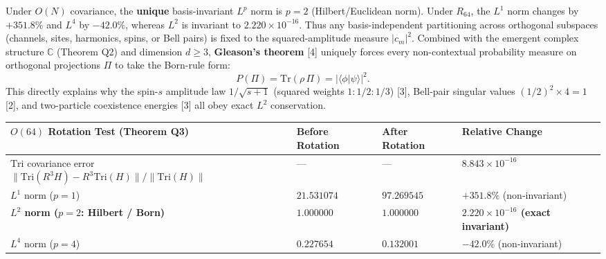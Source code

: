 \documentclass[
  a4paper,
]{article}
\newcounter{none} %
\begin{document}
Under \(O(N)\) covariance, the \textbf{unique} basis-invariant \(L^p\)
norm is \textbf{\(p = 2\)} (Hilbert/Euclidean norm). Under \(R_{64}\),
the \(L^1\) norm changes by \(+351.8\%\) and \(L^4\) by \(-42.0\%\),
whereas \(L^2\) is invariant to \textbf{\(2.220 \times 10^{-16}\)}. Thus
any basis-independent partitioning across orthogonal subspaces
(channels, sites, harmonics, spins, or Bell pairs) is fixed to the
squared-amplitude measure \(|c_m|^2\). Combined with the emergent
complex structure \(\mathbb{C}\) (Theorem Q2) and dimension \(d \ge 3\),
\textbf{Gleason's theorem} {[}4{]} uniquely forces every non-contextual
probability measure on orthogonal projections \(\Pi\) to take the
Born-rule form:
\[P(\Pi) = \mathrm{Tr}(\rho\,\Pi) = |\langle \phi | \psi \rangle|^2.\]
This directly explains why the spin-\(s\) amplitude law \(1/\sqrt{s+1}\)
(squared weights \(1:1/2:1/3\)) {[}3{]}, Bell-pair singular values
\((1/2)^2 \times 4 = 1\) {[}2{]}, and two-particle coexistence energies
{[}3{]} all obey exact \(L^2\) conservation.

{\def\LTcaptype{none} %
\begin{longtable}[]{@{}
  >{\raggedright\arraybackslash}p{}
  >{\centering\arraybackslash}p{}
  >{\centering\arraybackslash}p{}
  >{\centering\arraybackslash}p{}@{}}
\toprule\noalign{}
\begin{minipage}[b]{\linewidth}\raggedright
\(O(64)\) Rotation Test (Theorem Q3)
\end{minipage} & \begin{minipage}[b]{\linewidth}\centering
Before Rotation
\end{minipage} & \begin{minipage}[b]{\linewidth}\centering
After Rotation
\end{minipage} & \begin{minipage}[b]{\linewidth}\centering
Relative Change
\end{minipage} \\
\midrule\noalign{}
\endhead
\bottomrule\noalign{}
\endlastfoot
\(\mathrm{Tri}\) covariance error
\(\|\mathrm{Tri}(R^3 H)-R^3\mathrm{Tri}(H)\|/\|\mathrm{Tri}(H)\|\) & ---
& --- & \textbf{\(8.843 \times 10^{-16}\)} \\
\(L^1\) norm (\(p = 1\)) & \(21.531074\) & \(97.269545\) & \(+351.8\%\)
(non-invariant) \\
\textbf{\(L^2\) norm (\(p = 2\): Hilbert / Born)} &
\textbf{\(1.000000\)} & \textbf{\(1.000000\)} &
\textbf{\(2.220 \times 10^{-16}\) (exact invariant)} \\
\(L^4\) norm (\(p = 4\)) & \(0.227654\) & \(0.132001\) & \(-42.0\%\)
(non-invariant) \\
\end{longtable}
}
\end{document}
